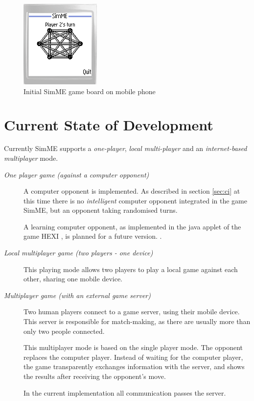 	\begin{figure}[h]
	\begin{center}
		\includegraphics{pics/simme-screen.png}
		\caption{Initial SimME game board on mobile phone}
		\label{fig:gameboard}
	\end{center}
	\end{figure}

\section{Current State of Development}

	Currently SimME supports a \emph{one-player}, \emph{local multi-player} and an
	\emph{internet-based multiplayer} mode.

	\begin{description}

		\item [\textit{One player game (against a computer opponent)}]

			A computer opponent is implemented. As described in section
			\ref{sec:ci} at this time there is no \textit{intelligent} computer
			opponent integrated in the game SimME, but an opponent taking
			randomised turns.

			A learning computer opponent, as implemented in the java applet of
			the game HEXI \cite{slany_paper}, is planned for a future version. .

		\item [\textit{Local multiplayer game (two players - one device)}]

			This playing mode allows two players to play a local game against
			each other, sharing one mobile device.

		\item [\textit{Multiplayer game (with an external game server)}]

			Two human players connect to a game server, using their mobile
			device. This server is responsible for match-making, as there are
			usually more than only two people connected.

			This multiplayer mode is based on the single player mode. The
			opponent replaces the computer player. Instead of waiting for the
			computer player, the game transparently exchanges information with
			the server, and shows the results after receiving the opponent's
			move.

			In the current implementation all communication passes the server.

	\end{description}



